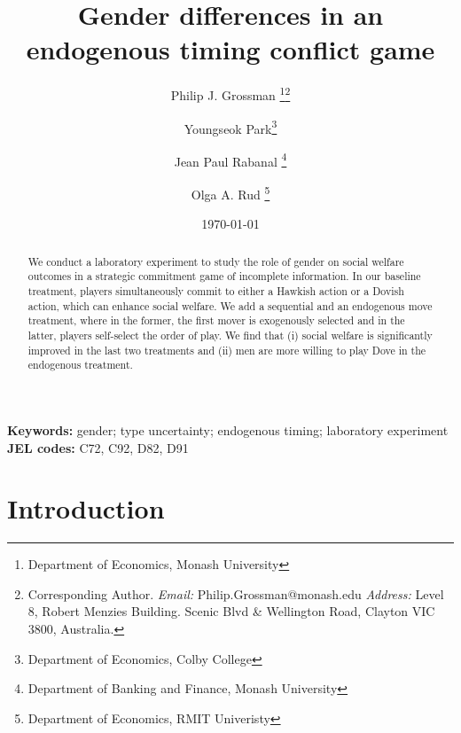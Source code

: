 \documentclass[12pt,english]{article}
\begin{document}
\title{Gender differences in an endogenous timing conflict game }

\author{Philip J. Grossman
\thanks{Department of Economics, Monash University}\thanks{Corresponding Author. \textit{Email:} Philip.Grossman@monash.edu \textit{Address:} Level 8, Robert Menzies Building. Scenic Blvd \& Wellington Road, Clayton VIC 3800, Australia.} \and Youngseok Park\thanks{Department of Economics, Colby College} \and Jean Paul Rabanal
\footnote{Department of Banking and Finance, Monash University} \and Olga A. Rud \footnote{Department of Economics, RMIT Univeristy} }\date{\today}
\maketitle
\begin{abstract}
We conduct a laboratory experiment to study the role of gender on social welfare outcomes in a strategic commitment game of incomplete information. In our baseline treatment, players simultaneously commit to either a Hawkish action or a Dovish action, which can enhance social welfare. We add a sequential and an endogenous move treatment, where in the former, the first mover is exogenously selected and in the latter, players self-select the order of play. We find that (i) social welfare is significantly improved in the last two treatments and (ii) men are more willing to play Dove in the endogenous treatment.

\end{abstract}
\textbf{Keywords:}
gender; type uncertainty; endogenous timing; laboratory experiment\\
\textbf{JEL codes:} C72, C92, D82, D91
\newpage
\section{Introduction}
\label{sec:intro}
\end{document}
